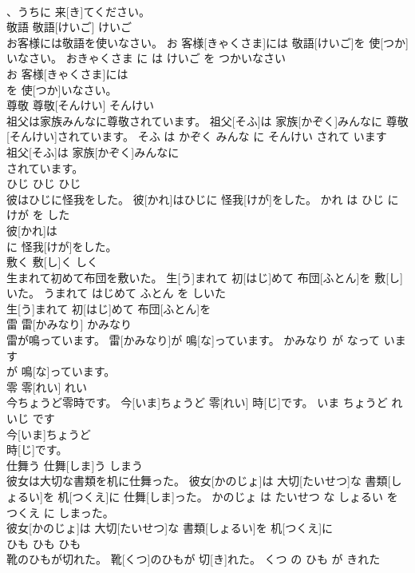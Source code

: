 \documentclass[8pt]{extreport}
\begin{document}
\begin{CJK}{UTF8}{min}
\\	、うちに 来[き]てください。			
\\	敬語	敬語[けいご]	けいご	
\\	お客様には敬語を使いなさい。	お 客様[きゃくさま]には 敬語[けいご]を 使[つか]いなさい。	おきゃくさま に は けいご を つかいなさい	
\\	お 客様[きゃくさま]には
\\	を 使[つか]いなさい。			
\\	尊敬	尊敬[そんけい]	そんけい	
\\	祖父は家族みんなに尊敬されています。	祖父[そふ]は 家族[かぞく]みんなに 尊敬[そんけい]されています。	そふ は かぞく みんな に そんけい されて います	
\\	祖父[そふ]は 家族[かぞく]みんなに
\\	されています。			
\\	ひじ	ひじ	ひじ	
\\	彼はひじに怪我をした。	彼[かれ]はひじに 怪我[けが]をした。	かれ は ひじ に けが を した	
\\	彼[かれ]は
\\	に 怪我[けが]をした。			
\\	敷く	敷[し]く	しく	
\\	生まれて初めて布団を敷いた。	生[う]まれて 初[はじ]めて 布団[ふとん]を 敷[し]いた。	うまれて はじめて ふとん を しいた	
\\	生[う]まれて 初[はじ]めて 布団[ふとん]を
\\	雷	雷[かみなり]	かみなり	
\\	雷が鳴っています。	雷[かみなり]が 鳴[な]っています。	かみなり が なって います	
\\	が 鳴[な]っています。			
\\	零	零[れい]	れい	
\\	今ちょうど零時です。	今[いま]ちょうど 零[れい] 時[じ]です。	いま ちょうど れいじ です	
\\	今[いま]ちょうど
\\	時[じ]です。			
\\	仕舞う	仕舞[しま]う	しまう	
\\	彼女は大切な書類を机に仕舞った。	彼女[かのじょ]は 大切[たいせつ]な 書類[しょるい]を 机[つくえ]に 仕舞[しま]った。	かのじょ は たいせつ な しょるい を つくえ に しまった。	
\\	彼女[かのじょ]は 大切[たいせつ]な 書類[しょるい]を 机[つくえ]に
\\	ひも	ひも	ひも	
\\	靴のひもが切れた。	靴[くつ]のひもが 切[き]れた。	くつ の ひも が きれた	

\end{CJK}
\end{document}
